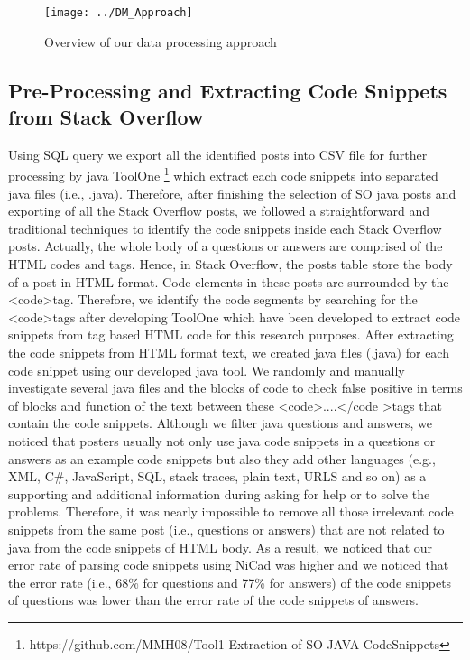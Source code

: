 \documentclass[conference]{IEEEtran}
\begin{document}
	\begin{figure*}[h]
		\centering
		\texttt{[image: ../DM\_Approach]}
		\caption{Overview of our data processing approach}
		\label{fig:dmapproach}
	\end{figure*}
	
	\subsection{Pre-Processing and Extracting Code Snippets from Stack Overflow}\label{AA}
	Using SQL query we export all the identified posts into CSV file for further processing by java ToolOne \footnote{https://github.com/MMH08/Tool1-Extraction-of-SO-JAVA-CodeSnippets} which extract each code snippets into separated java files (i.e., .java). Therefore, after finishing the selection of SO java posts and exporting of all the Stack Overflow posts, we followed a straightforward and traditional techniques to identify the code snippets inside each Stack Overflow posts. Actually, the whole body of a questions or answers are comprised of the HTML codes and tags. Hence, in Stack Overflow, the posts table store the body of a post in HTML format. Code elements in these posts are surrounded by the \textless code\textgreater  tag. Therefore, we identify the code segments by searching for the \textless code\textgreater tags after developing ToolOne which have been developed to extract code snippets from tag based HTML code for this research purposes. After extracting the code snippets from HTML format text, we created java files (.java) for each code snippet using our developed java tool. We randomly and manually investigate several java files and the blocks of code to check false positive in terms of blocks and function of the text between these \textless code\textgreater....\textless/code \textgreater tags that contain the code snippets. Although we filter java questions and answers, we noticed that posters usually not only use java code snippets in a questions or answers as an example code snippets but also they add other languages (e.g., XML, C\#, JavaScript, SQL, stack traces, plain text, URLS and so on) as a supporting and additional information during asking for help or to solve the problems. Therefore, it was nearly impossible to remove all those irrelevant code snippets from the same post (i.e., questions or answers) that are not related to java from the code snippets of HTML body. As a result, we noticed that our error rate of parsing code snippets using NiCad was higher and we noticed that the error rate (i.e., 68\% for questions and 77\%  for answers) of the code snippets of questions was lower than the error rate of the code snippets of answers. 
	
\end{document}
